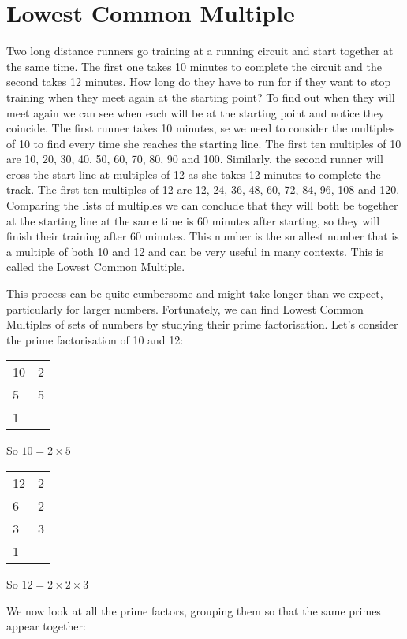 \documentclass[11pt, oneside]{article}
\theoremstyle{definition}
\begin{document}
\section{Lowest Common Multiple}

Two long distance runners go training at a running circuit and start together at the same time. The first one takes 10 minutes to complete the circuit and the second takes 12 minutes. How long do they have to run for if they want to stop training when they meet again at the starting point? To find out when they will meet again we can see when each will be at the starting point and notice they coincide. The first runner takes 10 minutes, se we need to consider the multiples of 10 to find every time she reaches the starting line. The first ten multiples of 10 are 10, 20, 30, 40, 50, 60, 70, 80, 90 and 100. Similarly, the second runner will cross the start line at multiples of 12 as she takes 12 minutes to complete the track. The first ten multiples of 12 are 12, 24, 36, 48, 60, 72, 84, 96, 108 and 120. Comparing the lists of multiples we can conclude that they will both be together at the starting line at the same time is 60 minutes after starting, so they will finish their training after 60 minutes. This number is the smallest number that is a multiple of both 10 and 12 and can be very useful in many contexts. This is called the Lowest Common Multiple.

This process can be quite cumbersome and might take longer than we expect, particularly for larger numbers. Fortunately, we can find Lowest Common Multiples of sets of numbers by studying their prime factorisation. Let's consider the prime factorisation of 10 and 12:

\begin{tabular}{ p{0.5cm} | p{1.5cm}}
10 & 2  \\
5 & 5  \\
1 &  
\end{tabular}

So $10 = 2 \times 5$

\bigbreak

\begin{tabular}{ p{0.5cm} | p{1.5cm}}
12 & 2  \\
6 & 2  \\
3 & 3  \\
1 
\end{tabular}

So $12 = 2 \times 2 \times 3$

We now look at all the prime factors, grouping them so that the same primes appear together:
\end{document}
